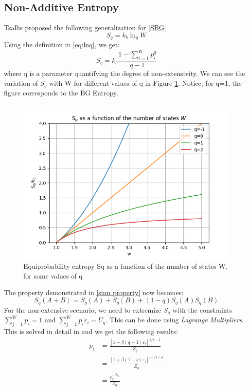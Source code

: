 \documentclass[11pt]{article}
\numberwithin{equation}{section}
\begin{document}
\subsection{Non-Additive Entropy}
Tsallis proposed the following generalization for \ref{SBG}
\begin{equation}
	S_q=k_b\ln_q W
\end{equation}
Using the definition in \eqref{eq:lnq}, we get:
\begin{equation}
	S_q=k_b\frac{1-\sum_{i=1}^{W}p_i^q}{q-1}
\end{equation}
where q is a parameter quantifying the degree of non-extensivity. We can see the variation of $S_q$ with W for different values of q in Figure \ref{fig:S_q with q}. Notice, for q=1, the figure corresponds to the BG Entropy.
\begin{figure}[H]
  \centering
  \includegraphics[width=0.9\linewidth]{"./Figures/S_q with w.png"}
  \caption{Equiprobability entropy Sq as a function of the number of states W, for some values of q}
  \label{fig:S_q with q}
\end{figure}
The property demonstrated in \eqref{sum property} now becomes:
\begin{equation}
	S_{q}(A+B)=S_{q}(A)+S_{q}(B)+ (1-q)S_{q}(A)S_{q}(B)
\end{equation}
For the non-extensive scenario, we need to extremize $S_q$ with the constraints $\sum_{j=1}^{W}p_i=1$ and $\sum_{j=1}^{W}p_i \varepsilon_i=U_q$. This can be done using \textit{Lagrange Multipliers}. This is solved in detail in \cite{tsallis1988possible} and we get the following results:
\begin{align}
	p_i&=\frac{[1-\beta(q-1)\varepsilon_i]^{1/q-1}}{Z_q}\nonumber\\
		&=\frac{[1+\beta(1-q)\varepsilon_i]^{-1/1-q}}{Z_q}\\ \label{eq:p_i for S_q}
		&=\frac{e_q^{-\beta\varepsilon_i}}{Z_q}\nonumber
\end{align}
\end{document}
